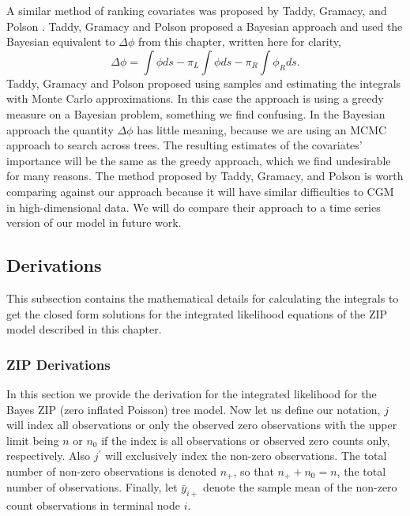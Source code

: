 A similar method of ranking covariates was proposed by Taddy, Gramacy, and Polson \cite{taddy2011dynamic}. Taddy, Gramacy and Polson proposed a Bayesian approach and used the Bayesian equivalent to $\Delta\phi$ from this chapter, written here for clarity, 
\begin{equation}
\Delta\phi = \int\phi ds - \pi_L\int\phi ds -\pi_R \int \phi_Rds. 
 \end{equation}
Taddy, Gramacy and Polson proposed using samples and estimating the integrals with Monte Carlo approximations. In this case the approach is using a greedy measure on a Bayesian problem, something we find confusing.
In the Bayesian approach the quantity $\Delta\phi$ has little meaning, because we are using an MCMC approach to search across trees. The resulting estimates of the covariates' importance will be the same as the greedy approach, which we find undesirable for many reasons. The method proposed by Taddy, Gramacy, and Polson is worth comparing against our approach because it will have similar difficulties to CGM in high-dimensional data. We will do compare their approach to a time series version of our model in future work.
 

 

%

\subsection{Derivations}
\label{ch:p3sub_theory}

This subsection contains the mathematical details for calculating the integrals to get the closed form solutions for the integrated likelihood equations of the ZIP model described in this chapter.   


\subsubsection{ZIP Derivations}

In this section we provide the derivation for the integrated likelihood for the Bayes ZIP (zero inflated Poisson) tree model. Now let us define our notation, $j$ will index all observations or only the observed zero observations with the upper limit being $n$ or  $n_0$ if the index is all observations or observed zero counts only, respectively.  Also $j^{\prime}$ will exclusively index the non-zero observations. The total number of non-zero observations is denoted $n_+$, so that $n_++n_0=n$, the total number of observations. Finally, let $\bar{y}_{i+}$ denote the sample mean of the non-zero count observations in terminal node $i$. 

